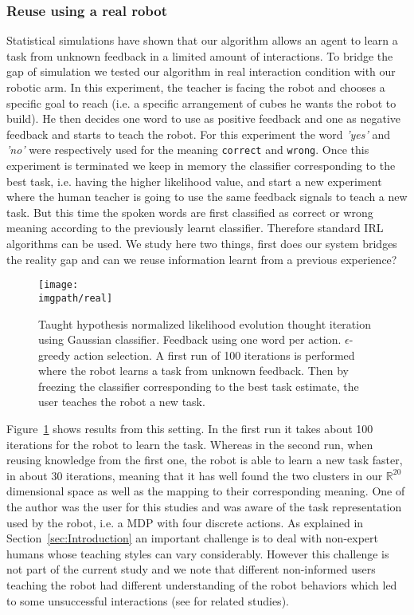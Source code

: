 \subsubsection{Reuse using a real robot}

Statistical simulations have shown that our algorithm allows an agent to learn a task from unknown feedback in a limited amount of interactions. To bridge the gap of simulation we tested our algorithm in real interaction condition with our robotic arm. In this experiment, the teacher is facing the robot and chooses a specific goal to reach (i.e. a specific arrangement of cubes he wants the robot to build). He then decides one word to use as positive feedback and one as negative feedback and starts to teach the robot. For this experiment the word \textit{'yes'} and \textit{'no'} were respectively used for the meaning \texttt{correct} and \texttt{wrong}. Once this  experiment is terminated we keep in memory the classifier corresponding to the best task, i.e. having the higher likelihood value, and start a new experiment where the human teacher is going to use the same feedback signals to teach a new task. But this time the spoken words are first classified as correct or wrong meaning according to the previously learnt classifier. Therefore standard IRL algorithms can be used. We study here two things, first does our system bridges the reality gap and can we reuse information learnt from a previous experience? 

\begin{figure}[!htbp]
  \centering
  \texttt{[image: \\imgpath/real]}
  \caption{Taught hypothesis normalized likelihood evolution thought iteration using Gaussian classifier.  Feedback using one word per action. $\epsilon$-greedy action selection. A first run of 100 iterations is performed where the robot learns a task from unknown feedback. Then by freezing the classifier corresponding to the best task estimate, the user teaches the robot a new task.}
  \label{Real}
\end{figure}

Figure~\ref{Real} shows results from this setting. In the first run it takes about 100 iterations for the robot to learn the task. Whereas in the second run, when reusing knowledge from the first one, the robot is able to learn a new task faster, in about 30 iterations, meaning that it has well found the two clusters in our $\mathbb{R}^{20}$ dimensional space as well as the mapping to their corresponding meaning. One of the author was the user for this studies and was aware of the task representation used by the robot, i.e. a MDP with four discrete actions. As explained in Section~\ref{sec:Introduction} an important challenge is to deal with non-expert humans whose teaching styles can vary considerably. However this challenge is not part of the current study and we note that different non-informed users teaching the robot had different understanding of the robot behaviors which led to some unsuccessful interactions (see \cite{thomaz2008teachable} for related studies).

